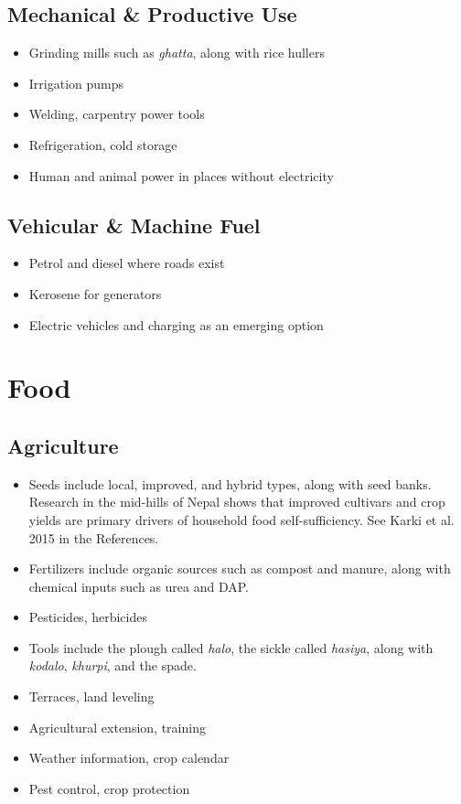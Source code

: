 \documentclass[11pt,a4paper]{article}
\begin{document}
\subsection{Mechanical \& Productive Use}
\begin{itemize}
    \item Grinding mills such as \textit{ghatta}, along with rice hullers
    \item Irrigation pumps
    \item Welding, carpentry power tools
    \item Refrigeration, cold storage
    \item Human and animal power in places without electricity
\end{itemize}

\subsection{Vehicular \& Machine Fuel}
\begin{itemize}
    \item Petrol and diesel where roads exist
    \item Kerosene for generators
    \item Electric vehicles and charging as an emerging option
\end{itemize}

\section{Food}

\subsection{Agriculture}
\begin{itemize}
    \item Seeds include local, improved, and hybrid types, along with seed banks. Research in the mid-hills of Nepal shows 
    that improved cultivars and crop yields are primary drivers of household food self-sufficiency. See Karki et al. 2015 in the References.
    \item Fertilizers include organic sources such as compost and manure, along with chemical inputs such as urea and DAP.
    \item Pesticides, herbicides
    \item Tools include the plough called \textit{halo}, the sickle called \textit{hasiya}, along with \textit{kodalo}, \textit{khurpi}, and the spade.
    \item Terraces, land leveling
    \item Agricultural extension, training
    \item Weather information, crop calendar
    \item Pest control, crop protection
\end{itemize}
\end{document}

